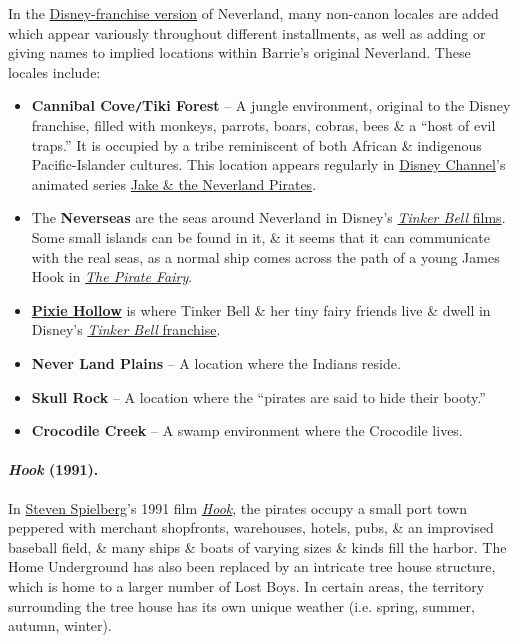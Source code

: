 \documentclass[oneside]{book}
\numberwithin{equation}{section}
\begin{document}
In the \href{https://en.wikipedia.org/wiki/Peter_Pan_(franchise)}{Disney-franchise version} of Neverland, many non-canon locales are added which appear variously throughout different installments, as well as adding or giving names to implied locations within Barrie's original Neverland. These locales include:
\begin{itemize}
	\item \textbf{Cannibal Cove\texttt{/}Tiki Forest} -- A jungle environment, original to the Disney franchise, filled with  monkeys, parrots, boars, cobras, bees \& a ``host of evil traps.'' It is occupied by a tribe reminiscent of both African \& indigenous Pacific-Islander cultures. This location appears regularly in \href{https://en.wikipedia.org/wiki/Disney_Channel}{Disney Channel}'s animated series \href{https://en.wikipedia.org/wiki/Jake_and_the_Neverland_Pirates}{Jake \& the Neverland Pirates}.
	\item The \textbf{Neverseas} are the seas around Neverland in Disney's \href{https://en.wikipedia.org/wiki/Tinker_Bell_(film_series)}{\textit{Tinker Bell} films}. Some small islands can be found in it, \& it seems that it can communicate with the real seas, as a normal ship comes across the path of a young James Hook in \href{https://en.wikipedia.org/wiki/The_Pirate_Fairy}{\textit{The Pirate Fairy}}.
	\item \href{https://en.wikipedia.org/wiki/Pixie_Hollow}{\textbf{Pixie Hollow}} is where Tinker Bell \& her tiny fairy friends live \& dwell in Disney's \href{https://en.wikipedia.org/wiki/Disney_Fairies}{\textit{Tinker Bell} franchise}.
	\item \textbf{Never Land Plains} -- A location where the Indians reside.
	\item \textbf{Skull Rock} -- A location where the ``pirates are said to hide their booty.''
	\item \textbf{Crocodile Creek} -- A swamp environment where the Crocodile lives.
\end{itemize}

\paragraph{\textit{Hook} (1991).} In \href{https://en.wikipedia.org/wiki/Steven_Spielberg}{Steven Spielberg}'s 1991 film \href{https://en.wikipedia.org/wiki/Hook_(film)}{\textit{Hook}}, the pirates occupy a small port town peppered with merchant shopfronts, warehouses, hotels, pubs, \& an improvised baseball field, \& many ships \& boats of varying sizes \& kinds fill the harbor. The Home Underground has also been replaced by an intricate tree house structure, which is home to a larger number of Lost Boys. In certain areas, the territory surrounding the tree house has its own unique weather (i.e. spring, summer, autumn, winter).
\end{document}
